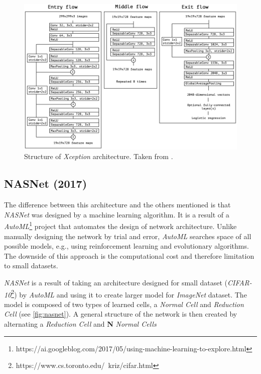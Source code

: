 \begin{figure}
    \includegraphics[width=\textwidth]{img/xception}
    \caption{Structure of \textit{Xception} architecture. Taken from \cite[fig. 5]{bib:xception}.}
    \label{fig:xception}
\end{figure}


\subsection{NASNet (2017)}
\label{sec:nasnet}
The difference between this architecture and the others mentioned is that \textit{NASNet} \cite{bib:nasnet} was designed by a machine learning algorithm. It is a result of a \textit{AutoML}\footnote{https://ai.googleblog.com/2017/05/using-machine-learning-to-explore.html} project that automates the design of network architecture. Unlike manually designing the network by trial and error, \textit{AutoML} searches space of all possible models, e.g., using reinforcement learning and evolutionary algorithms. The downside of this approach is the computational cost and therefore limitation to small datasets.

\textit{NASNet} is a result of taking an architecture designed for small dataset (\textit{CIFAR-10}\footnote{https://www.cs.toronto.edu/~kriz/cifar.html}) by \textit{AutoML} and using it to create larger model for \textit{ImageNet} dataset. The model is composed of two types of learned cells, a \textit{Normal Cell} and \textit{Reduction Cell} (see \cref{fig:nasnet}). A general structure of the network is then created by alternating a \textit{Reduction Cell} and \textbf{N} \textit{Normal Cells}

